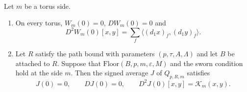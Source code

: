 \begin{lemma}
\label{lem:ex-soft-quadratic-hessian}
Let $m$ be a torus side.
\begin{enumerate}
\item On every torus, $W_m(0)=0$, $DW_m(0)=0$ and
 \[
  D^2W_m(0)[x,y]=\sum_f\langle(d_1x)_f,(d_1y)_f\rangle .
 \]
\item Let $R$ satisfy the path bound with parameters
 $(p,\tau,A,\Lambda)$ and let $B$ be attached to $R$. Suppose that
 $\mathrm{Floor}(B,p,m,\varepsilon,M)$ and the sworn condition hold at
 the side $m$. Then the signed average $J$ of $Q_{p,R,m}$ satisfies
 \[
  J(0)=0,\qquad DJ(0)=0,\qquad D^2J(0)[x,y]=\mathcal K_m(x,y).
 \]
\end{enumerate}
\end{lemma}

